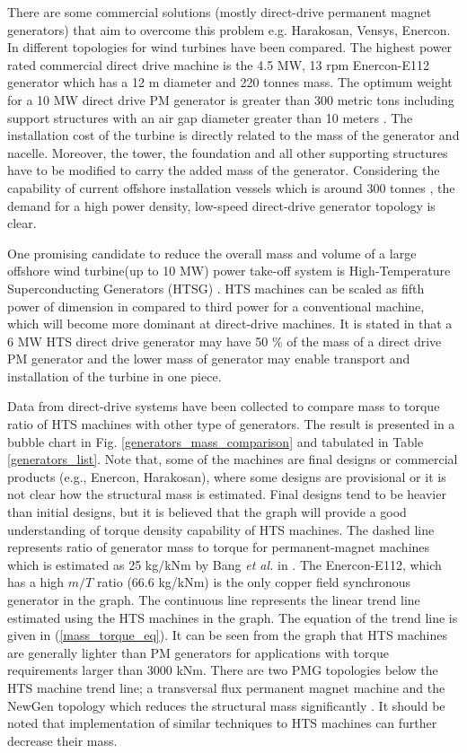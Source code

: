 \documentclass[12pt]{iopart}
\begin{document}
There are some commercial solutions (mostly direct-drive permanent magnet generators) that aim to overcome this problem e.g. Harakosan, Vensys, Enercon. In \cite{Bang2008} different topologies for wind turbines have been compared. The highest power rated  commercial direct drive machine is the 4.5 MW, 13 rpm Enercon-E112 generator which has a 12 m diameter and 220 tonnes mass. The optimum weight for a 10 MW direct drive PM generator is greater than 300 metric tons including support structures with an air gap diameter greater than 10 meters \cite{Bang2008}. The installation cost of the turbine is directly related to the mass of the generator and nacelle. Moreover, the tower, the foundation and all other supporting structures have to be modified to carry the added mass of the generator. Considering the capability of current offshore installation vessels which is around 300 tonnes \cite{Lewis2007}, the demand for a high power density, low-speed direct-drive generator topology is clear.

One promising candidate to reduce the overall mass and volume of a large offshore wind turbine(up to 10 MW) power take-off system is High-Temperature Superconducting Generators (HTSG) \cite{Lesser2009, Lewis2007, Kalsi2004}. HTS machines can be scaled as fifth power of dimension in \cite{Kalsi2004} compared to third power for a conventional machine, which will become more dominant at direct-drive machines. It is stated in \cite{Lewis2007} that a 6 MW HTS direct drive generator may have 50 \% of the mass of a direct drive PM generator and the lower mass of generator may enable transport and installation of the turbine in one piece.


Data from direct-drive systems have been collected to compare mass to torque ratio of HTS machines with other type of generators. The result is presented in a bubble chart in Fig. \ref{generators_mass_comparison} and tabulated in Table \ref{generators_list}.  Note that, some of the machines are final designs or commercial products (e.g., Enercon, Harakosan), where some designs are provisional or it is not clear how the structural mass is estimated. Final designs tend to be heavier than initial designs, but it is believed that the graph will provide a good understanding of torque density capability of HTS machines.  The dashed line represents ratio of generator mass to torque for permanent-magnet machines which is estimated as 25 kg/kNm by Bang \textit{et al.} in \cite{Bang2008}. The Enercon-E112, which has a high $m/T$ ratio (66.6 kg/kNm) is the only copper field synchronous generator in the graph. The continuous line represents the linear trend line estimated using the HTS machines in the graph. The equation of the trend line is given in (\ref{mass_torque_eq}). It can be seen from the graph that HTS machines are generally lighter than PM generators for applications with torque requirements larger than 3000 kNm. There are two PMG topologies below the HTS machine trend line; a transversal flux permanent magnet machine \cite{Bang2009} and the NewGen topology which reduces the structural mass significantly \cite{Engstrom2004}. It should be noted that implementation of similar techniques to HTS machines can further decrease their mass. 
\end{document}
